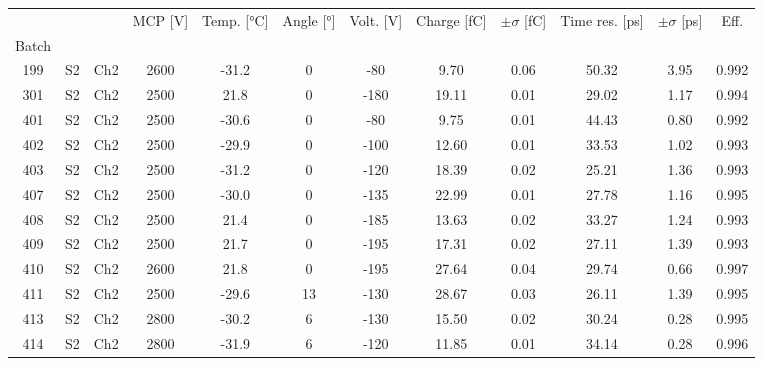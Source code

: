 \begin{tabular}{cccccccccccc}
\toprule
 &  &  & MCP [V] & Temp. [°C] & Angle [°] & Volt. [V] & Charge [fC] & \(\pm\sigma\) [fC] & Time res. [ps] & \(\pm\sigma\) [ps] & Eff. \\
Batch &  &  &  &  &  &  &  &  &  &  &  \\
\midrule
199 & S2 & Ch2 & 2600 & -31.2 & 0 & -80 & 9.70 & 0.06 & 50.32 & 3.95 & 0.992 \\
301 & S2 & Ch2 & 2500 & 21.8 & 0 & -180 & 19.11 & 0.01 & 29.02 & 1.17 & 0.994 \\
401 & S2 & Ch2 & 2500 & -30.6 & 0 & -80 & 9.75 & 0.01 & 44.43 & 0.80 & 0.992 \\
402 & S2 & Ch2 & 2500 & -29.9 & 0 & -100 & 12.60 & 0.01 & 33.53 & 1.02 & 0.993 \\
403 & S2 & Ch2 & 2500 & -31.2 & 0 & -120 & 18.39 & 0.02 & 25.21 & 1.36 & 0.993 \\
407 & S2 & Ch2 & 2500 & -30.0 & 0 & -135 & 22.99 & 0.01 & 27.78 & 1.16 & 0.995 \\
408 & S2 & Ch2 & 2500 & 21.4 & 0 & -185 & 13.63 & 0.02 & 33.27 & 1.24 & 0.993 \\
409 & S2 & Ch2 & 2500 & 21.7 & 0 & -195 & 17.31 & 0.02 & 27.11 & 1.39 & 0.993 \\
410 & S2 & Ch2 & 2600 & 21.8 & 0 & -195 & 27.64 & 0.04 & 29.74 & 0.66 & 0.997 \\
411 & S2 & Ch2 & 2500 & -29.6 & 13 & -130 & 28.67 & 0.03 & 26.11 & 1.39 & 0.995 \\
413 & S2 & Ch2 & 2800 & -30.2 & 6 & -130 & 15.50 & 0.02 & 30.24 & 0.28 & 0.995 \\
414 & S2 & Ch2 & 2800 & -31.9 & 6 & -120 & 11.85 & 0.01 & 34.14 & 0.28 & 0.996 \\
\bottomrule
\end{tabular}
